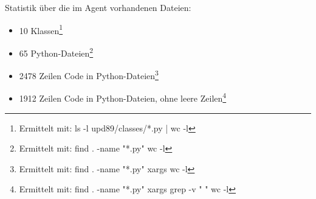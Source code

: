 Statistik über die im Agent vorhandenen Dateien:

\begin{itemize}
\item 10 Klassen\footnote{Ermittelt mit: ls -l upd89/classes/*.py | wc -l}
\item 65 Python-Dateien\footnote{Ermittelt mit: find . -name "*.py" \textbar wc -l}
\item 2478 Zeilen Code in Python-Dateien\footnote{Ermittelt mit: find . -name "*.py" \textbar xargs wc -l}
\item 1912 Zeilen Code in Python-Dateien, ohne leere Zeilen\footnote{Ermittelt mit: find . -name "*.py" \textbar xargs grep -v "  " \textbar wc -l}
\end{itemize}